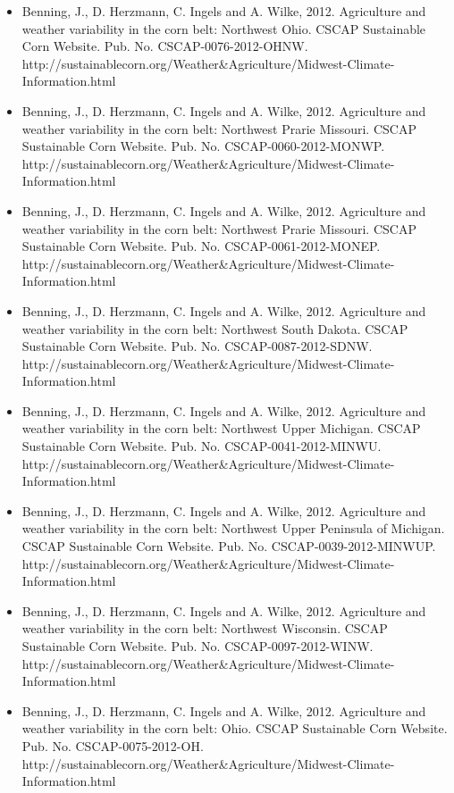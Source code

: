 \begin{itemize}
\item Benning, J., D. Herzmann, C. Ingels and A. Wilke, 2012. Agriculture and weather variability in the corn belt: Northwest Ohio. CSCAP Sustainable Corn Website. Pub. No. CSCAP-0076-2012-OHNW. http://sustainablecorn.org/Weather\&Agriculture/Midwest-Climate-Information.html

\item Benning, J., D. Herzmann, C. Ingels and A. Wilke, 2012. Agriculture and weather variability in the corn belt: Northwest Prarie Missouri. CSCAP Sustainable Corn Website. Pub. No. CSCAP-0060-2012-MONWP. http://sustainablecorn.org/Weather\&Agriculture/Midwest-Climate-Information.html

\item Benning, J., D. Herzmann, C. Ingels and A. Wilke, 2012. Agriculture and weather variability in the corn belt: Northwest Prarie Missouri. CSCAP Sustainable Corn Website. Pub. No. CSCAP-0061-2012-MONEP. http://sustainablecorn.org/Weather\&Agriculture/Midwest-Climate-Information.html

\item Benning, J., D. Herzmann, C. Ingels and A. Wilke, 2012. Agriculture and weather variability in the corn belt: Northwest South Dakota. CSCAP Sustainable Corn Website. Pub. No. CSCAP-0087-2012-SDNW. http://sustainablecorn.org/Weather\&Agriculture/Midwest-Climate-Information.html

\item Benning, J., D. Herzmann, C. Ingels and A. Wilke, 2012. Agriculture and weather variability in the corn belt: Northwest Upper Michigan. CSCAP Sustainable Corn Website. Pub. No. CSCAP-0041-2012-MINWU. http://sustainablecorn.org/Weather\&Agriculture/Midwest-Climate-Information.html

\item Benning, J., D. Herzmann, C. Ingels and A. Wilke, 2012. Agriculture and weather variability in the corn belt: Northwest Upper Peninsula of Michigan. CSCAP Sustainable Corn Website. Pub. No. CSCAP-0039-2012-MINWUP. http://sustainablecorn.org/Weather\&Agriculture/Midwest-Climate-Information.html

\item Benning, J., D. Herzmann, C. Ingels and A. Wilke, 2012. Agriculture and weather variability in the corn belt: Northwest Wisconsin. CSCAP Sustainable Corn Website. Pub. No. CSCAP-0097-2012-WINW. http://sustainablecorn.org/Weather\&Agriculture/Midwest-Climate-Information.html

\item Benning, J., D. Herzmann, C. Ingels and A. Wilke, 2012. Agriculture and weather variability in the corn belt: Ohio. CSCAP Sustainable Corn Website. Pub. No. CSCAP-0075-2012-OH. http://sustainablecorn.org/Weather\&Agriculture/Midwest-Climate-Information.html


\end{itemize}
